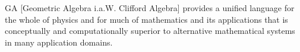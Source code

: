 
GA [Geometric Algebra i.a.W. Clifford Algebra] provides a unified language for the whole of physics and for much of mathematics and its applications that is conceptually and computationally superior to alternative mathematical systems in many application domains.